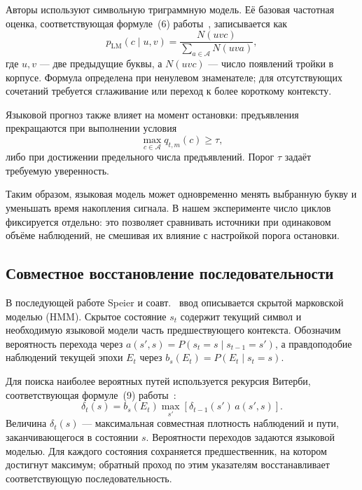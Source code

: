 \documentclass[11pt,a4paper]{article}
\begin{document}
Авторы используют символьную триграммную модель.
Её базовая частотная оценка, соответствующая
формуле~(6) работы~\citep{p22156110}, записывается как
\begin{equation}\label{eq:review-trigram}
p_{\mathrm{LM}}(c\mid u,v)=
\frac{N(uvc)}
{\displaystyle\sum_{a\in\mathcal A}N(uva)},
\end{equation}
где $u,v$ --- две предыдущие буквы,
а $N(uvc)$ --- число появлений тройки в корпусе.
Формула определена при ненулевом знаменателе;
для отсутствующих сочетаний требуется сглаживание
или переход к более короткому контексту.

Языковой прогноз также влияет на момент остановки:
предъявления прекращаются при выполнении условия
\begin{equation}\label{eq:review-stop}
\max_{c\in\mathcal A}q_{t,m}(c)\geq\tau,
\end{equation}
либо при достижении предельного числа предъявлений.
Порог $\tau$ задаёт требуемую уверенность.

Таким образом, языковая модель может одновременно менять
выбранную букву и уменьшать время накопления сигнала.
В нашем эксперименте число циклов фиксируется отдельно:
это позволяет сравнивать источники при одинаковом
объёме наблюдений, не смешивая их влияние с настройкой
порога остановки.

\subsection{Совместное восстановление последовательности}

В последующей работе Speier и соавт.~\citep{p24760927}
ввод описывается скрытой марковской моделью (HMM).
Скрытое состояние $s_t$ содержит текущий символ
и необходимую языковой модели часть предшествующего
контекста. Обозначим вероятность перехода через
$a(s',s)=P(s_t=s\mid s_{t-1}=s')$,
а правдоподобие наблюдений текущей эпохи $E_t$
через $b_s(E_t)=P(E_t\mid s_t=s)$.

Для поиска наиболее вероятных путей используется
рекурсия Витерби, соответствующая формуле~(9)
работы~\citep{p24760927}:
\begin{equation}\label{eq:review-viterbi}
\delta_t(s)=
b_s(E_t)
\max_{s'}
\left[
\delta_{t-1}(s')\,a(s',s)
\right].
\end{equation}
Величина $\delta_t(s)$ --- максимальная совместная
плотность наблюдений и пути, заканчивающегося
в состоянии $s$. Вероятности переходов задаются
языковой моделью. Для каждого состояния сохраняется
предшественник, на котором достигнут максимум;
обратный проход по этим указателям восстанавливает
соответствующую последовательность.
\end{document}
